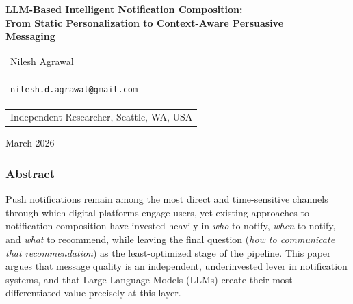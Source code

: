 \documentclass[11pt]{article}
\date{}
\begin{document}
\begin{center}

{\bf{\LARGE{LLM-Based Intelligent Notification Composition:\\
From Static Personalization to Context-Aware Persuasive\\
Messaging}}}

\vspace*{.2in}

{\large{
\begin{tabular}{c}
Nilesh Agrawal
\end{tabular}
\begin{tabular}{c}
\texttt{nilesh.d.agrawal@gmail.com}
\end{tabular}
}}

\vspace*{.15in}

\begin{tabular}{c}
Independent Researcher, Seattle, WA, USA
\end{tabular}

\vspace*{.1in}

March 2026

\end{center}

\vspace*{.2in}

\subsubsection*{Abstract}

Push notifications remain among the most direct and time-sensitive channels through which digital platforms engage users, yet existing approaches to notification composition have invested heavily in \textit{who} to notify, \textit{when} to notify, and \textit{what} to recommend, while leaving the final question (\textit{how to communicate that recommendation}) as the least-optimized stage of the pipeline. This paper argues that message quality is an independent, underinvested lever in notification systems, and that Large Language Models (LLMs) create their most differentiated value precisely at this layer.
\end{document}
